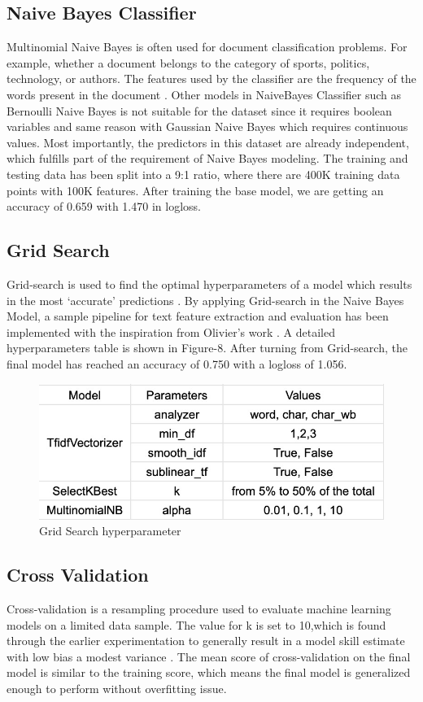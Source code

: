 \documentclass[journal,12pt,onecolumn]{IEEEtran}
\begin{document}
\subsection{Naive Bayes Classifier}
Multinomial Naive Bayes is often used for document classification problems. For example, whether a document belongs to the category of sports, politics, technology, or authors. The features used by the classifier are the frequency of the words present in the document \cite{naive_bayes}. Other models in NaiveBayes Classifier such as Bernoulli Naive Bayes is not suitable for the dataset since it requires boolean variables and same reason with Gaussian Naive Bayes which requires continuous values. Most importantly, the predictors in this dataset are already independent, which fulfills part of the requirement of Naive Bayes modeling. The training and testing data has been split into a 9:1 ratio, where there are 400K training data points with 100K features. After training the base model, we are getting an accuracy of 0.659 with 1.470 in logloss. 

\subsection{Grid Search}
Grid-search is used to find the optimal hyperparameters of a model which results in the most ‘accurate’ predictions \cite{gs}. By applying Grid-search in the Naive Bayes Model, a sample pipeline for text feature extraction and evaluation has been implemented with the inspiration from Olivier's work \cite{grid_search}. A detailed hyperparameters table is shown in Figure-8. After turning from Grid-search, the final model has reached an accuracy of 0.750 with a logloss of 1.056.

\begin{figure}[h]
    \centering
    \includegraphics[width=0.5\linewidth]{grid_search.png}
    \caption{Grid Search hyperparameter}
    \label{fig:hyperparameter}
\end{figure}

\subsection{Cross Validation}
Cross-validation is a resampling procedure used to evaluate machine learning models on a limited data sample. The value for k is set to 10,which is found through the earlier experimentation to generally result in a model skill estimate with low bias a modest variance \cite{cv}. The mean score of cross-validation on the final model is similar to the training score, which means the final model is generalized enough to perform without overfitting issue.
\end{document}
